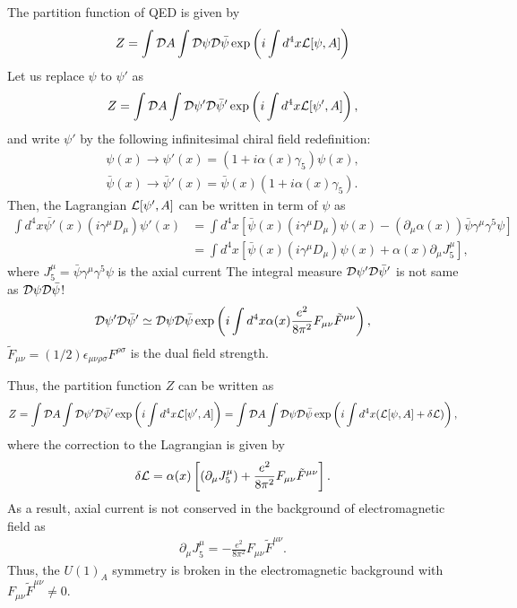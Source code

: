 \documentclass[11pt,a4paper]{article}
\begin{document}
The partition function of QED is given by
\begin{align}
    Z = \int {\cal D}A \int {\cal D}\psi {\cal D}\bar\psi \exp\left( i \int d^4 x {\cal L}[\psi, A]\right)
\end{align}
Let us replace $\psi$ to $\psi'$ as
\begin{align}
    Z = \int {\cal D}A \int {\cal D}\psi' {\cal D}\bar\psi' \exp\left( i \int d^4 x {\cal L}[\psi', A]\right),
\end{align}
and write $\psi'$ by the following infinitesimal chiral field redefinition:
\begin{align}
    \psi(x) \to \psi'(x) = (1 + i\alpha(x) \gamma_5) \psi(x), \\
    \bar\psi(x) \to \bar\psi'(x) = \bar\psi(x) (1 + i\alpha(x) \gamma_5).
\end{align}
Then, the Lagrangian ${\cal L}[\psi',A]$ can be written in term of $\psi$ as
\begin{align}
    \int d^4 x \bar{\psi'}(x) (i\gamma^\mu D_\mu) \psi'(x)
    &= \int d^4 x \left[ \bar\psi(x) (i\gamma^\mu D_\mu) \psi(x) - (\partial_\mu \alpha(x)) \bar\psi \gamma^\mu \gamma^5 \psi \right] \nonumber\\
    &= \int d^4 x \left[ \bar\psi(x) (i\gamma^\mu D_\mu) \psi(x) + \alpha(x) \partial_\mu J_5^\mu \right],
\end{align}
where $J_5^\mu = \bar\psi \gamma^\mu \gamma^5 \psi$ is the axial current
The integral measure ${\cal D}\psi'{\cal D}\bar\psi'$ is not same as ${\cal D}\psi {\cal D}\bar\psi$!
\begin{align}
    {\cal D}\psi' {\cal D}\bar\psi' \simeq {\cal D}\psi {\cal D}\bar\psi \exp\left( i \int d^4 x \alpha(x) \frac{e^2}{8\pi^2} F_{\mu\nu} \tilde F^{\mu\nu} \right),
\end{align}
$\tilde F_{\mu\nu} = (1/2) \epsilon_{\mu\nu\rho\sigma} F^{\rho\sigma}$ is the dual field strength.

Thus, the partition function $Z$ can be written as
\begin{align}
    Z = \int {\cal D}A \int {\cal D}\psi' {\cal D}\bar\psi' \exp\left( i \int d^4 x {\cal L}[\psi', A]\right)
    = \int {\cal D}A \int {\cal D}\psi {\cal D}\bar\psi \exp\left( i \int d^4 x ({\cal L}[\psi, A] + \delta{\cal L}) \right),
\end{align}
where the correction to the Lagrangian is given by
\begin{align}
    \delta {\cal L} = \alpha(x) \left[ (\partial_\mu J_5^\mu) + \frac{e^2}{8\pi^2} F_{\mu\nu} \tilde F^{\mu\nu} \right].
\end{align}
As a result, axial current is not conserved in the background of electromagnetic field as
\begin{align}
    \partial_\mu J_5^\mu = -\frac{e^2}{8\pi^2} F_{\mu\nu} \tilde F^{\mu\nu}.
\end{align}
Thus, the $U(1)_A$ symmetry is broken in the electromagnetic background with $F_{\mu\nu} \tilde F^{\mu\nu} \neq 0$.
\end{document}
